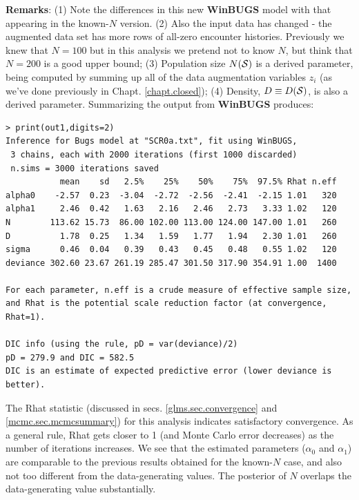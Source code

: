{\bf Remarks}:  (1) Note the differences in this new {\bf WinBUGS} model
with that appearing in the known-$N$ version.  (2) Also the input data
has changed - the augmented data set has more rows of
all-zero encounter histories. Previously we knew that $N=100$ but in this analysis we
pretend not to know $N$, but think that $N=200$ is a good upper bound;
(3) Population size $N({\cal S})$ is a derived parameter, being computed by
summing up all of the data augmentation variables $z_{i}$ (as we've
done previously in Chapt. \ref{chapt.closed}); (4) Density, $D\equiv D({\cal S})$, is also a derived
parameter. Summarizing the output from {\bf WinBUGS} produces:
{\small
\begin{verbatim}
> print(out1,digits=2)
Inference for Bugs model at "SCR0a.txt", fit using WinBUGS,
 3 chains, each with 2000 iterations (first 1000 discarded)
 n.sims = 3000 iterations saved
           mean    sd   2.5%    25%    50%    75%  97.5% Rhat n.eff
alpha0    -2.57  0.23  -3.04  -2.72  -2.56  -2.41  -2.15 1.01   320
alpha1     2.46  0.42   1.63   2.16   2.46   2.73   3.33 1.02   120
N        113.62 15.73  86.00 102.00 113.00 124.00 147.00 1.01   260
D          1.78  0.25   1.34   1.59   1.77   1.94   2.30 1.01   260
sigma      0.46  0.04   0.39   0.43   0.45   0.48   0.55 1.02   120
deviance 302.60 23.67 261.19 285.47 301.50 317.90 354.91 1.00  1400

For each parameter, n.eff is a crude measure of effective sample size,
and Rhat is the potential scale reduction factor (at convergence, Rhat=1).

DIC info (using the rule, pD = var(deviance)/2)
pD = 279.9 and DIC = 582.5
DIC is an estimate of expected predictive error (lower deviance is better).
\end{verbatim}
}

The Rhat statistic (discussed in secs. \ref{glms.sec.convergence} and
\ref{mcmc.sec.mcmcsummary}) for this analysis indicates satisfactory
convergence. 
As a general rule, Rhat gets closer to 1 (and Monte Carlo error decreases)
as the number of iterations increases.  We see that the
estimated parameters ($\alpha_0$ and $\alpha_1$) are comparable to the
previous results obtained for the known-$N$ case, and also not too
different from the data-generating values. The posterior of $N$
overlaps the data-generating value substantially.

